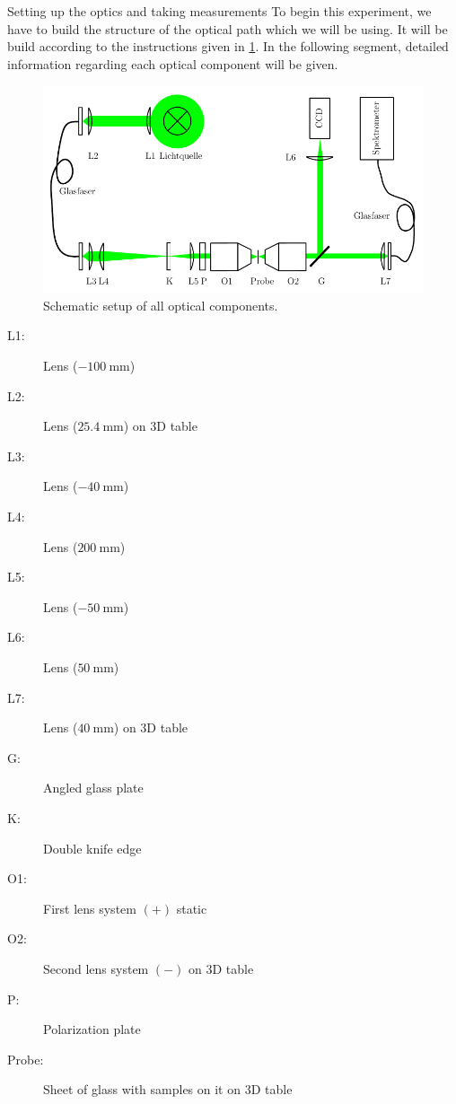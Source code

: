 \documentclass[pdftex, a4paper,11pt, twoside, UKenglish]{report}
\begin{document}
  \begin{chapter}{Setting up the optics and taking measurements}
    \label{chp:Setup}
    To begin this experiment, we have to build the structure of the optical
    path which we will be using. It will be build according to the instructions
    given in \cref{fig:Setup}. In the following segment, detailed information
    regarding each optical component will be given.
    \begin{figure}[hb]
      \centering
      \includegraphics[width=\textwidth]{Figures/Setup.png}
      \caption{Schematic setup of all optical components.\cite{bib:Anleitung}}
      \label{fig:Setup}
    \end{figure}
    
    \begin{minipage}{0.41\textwidth}
      \begin{description}
        \item[L1:] Lens ($\SI{-100}{\milli\meter}$)
        \item[L2:] Lens ($\SI{+25.4}{\milli\meter}$) on 3D table
        \item[L3:] Lens ($\SI{-40}{\milli\meter}$)
        \item[L4:] Lens ($\SI{+200}{\milli\meter}$)
        \item[L5:] Lens ($\SI{-50}{\milli\meter}$)
        \item[L6:] Lens ($\SI{+50}{\milli\meter}$)
        \item[L7:] Lens ($\SI{+40}{\milli\meter}$) on 3D table
      \end{description}
    \end{minipage}\quad
    \begin{minipage}{0.55\textwidth}
      \begin{description}
        \item[G:] Angled glass plate
        \item[K:] Double knife edge
        \item[O1:] First lens system $(+)$ static
        \item[O2:] Second lens system $(-)$ on 3D table
        \item[P:] Polarization plate
        \item[Probe:] Sheet of glass with samples on it on 3D table
      \end{description}
    \end{minipage}
    

\end{chapter}
\end{document}
